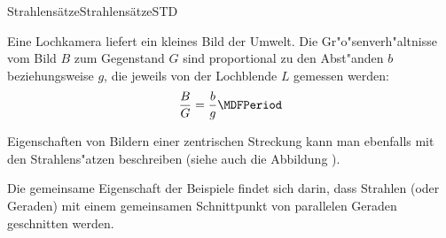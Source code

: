 \begin{MXContent}{Strahlens\"atze}{Strahlens\"atze}{STD}

Eine Lochkamera liefert ein kleines Bild der Umwelt. Die Gr"o"senverh"altnisse
vom Bild $B$ zum Gegenstand $G$ sind proportional zu den Abst"anden $b$ 
beziehungsweise $g$, die jeweils von der Lochblende $L$ gemessen werden:
\[
\frac{B}{G} = \frac{b}{g} \MDFPeriod %
\]

\begin{center}
\end{center}


Eigenschaften von Bildern einer zentrischen Streckung kann man ebenfalls
mit den Strahlens"atzen beschreiben (siehe auch die Abbildung 
).

Die gemeinsame Eigenschaft der Beispiele findet sich darin, dass Strahlen (oder 
Geraden) mit einem gemeinsamen Schnittpunkt von parallelen Geraden geschnitten
werden.



\end{MXContent}
